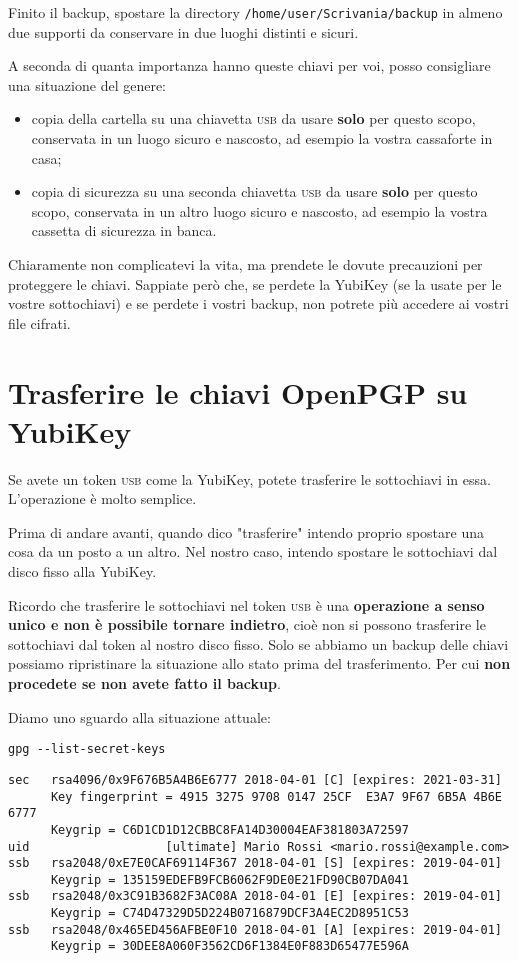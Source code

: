 \documentclass[a4paper,10pt]{article}
\begin{document}
Finito il backup, spostare la directory \texttt{/home/user/Scrivania/backup} in almeno due supporti da conservare in due luoghi distinti e sicuri.

A seconda di quanta importanza hanno queste chiavi per voi, posso consigliare una situazione del genere:

\begin{itemize}
 \item copia della cartella su una chiavetta \textsc{usb} da usare \textbf{solo} per questo scopo, conservata in un luogo sicuro e nascosto, ad esempio la vostra cassaforte in casa;
 \item copia di sicurezza su una seconda chiavetta \textsc{usb} da usare \textbf{solo} per questo scopo, conservata in un altro luogo sicuro e nascosto, ad esempio la vostra cassetta di sicurezza in banca.
\end{itemize}

Chiaramente non complicatevi la vita, ma prendete le dovute precauzioni per proteggere le chiavi. Sappiate però che, se perdete la YubiKey (se la usate per le vostre sottochiavi) e se perdete i vostri backup, non potrete più accedere ai vostri file cifrati.

\section{Trasferire le chiavi OpenPGP su YubiKey}

Se avete un token \textsc{usb} come la YubiKey, potete trasferire le sottochiavi in essa. L'operazione è molto semplice.

Prima di andare avanti, quando dico "trasferire" intendo proprio spostare una cosa da un posto a un altro. Nel nostro caso, intendo spostare le sottochiavi dal disco fisso alla YubiKey.

Ricordo che trasferire le sottochiavi nel token \textsc{usb} è una \textbf{operazione a senso unico e non è possibile tornare indietro}, cioè non si possono trasferire le sottochiavi dal token al nostro disco fisso. Solo se abbiamo un backup delle chiavi possiamo ripristinare la situazione allo stato prima del trasferimento. Per cui \textbf{non procedete se non avete fatto il backup}.

Diamo uno sguardo alla situazione attuale:

\begin{lstlisting}
gpg --list-secret-keys
\end{lstlisting}

\begin{lstlisting}
sec   rsa4096/0x9F676B5A4B6E6777 2018-04-01 [C] [expires: 2021-03-31]
      Key fingerprint = 4915 3275 9708 0147 25CF  E3A7 9F67 6B5A 4B6E 6777
      Keygrip = C6D1CD1D12CBBC8FA14D30004EAF381803A72597
uid                   [ultimate] Mario Rossi <mario.rossi@example.com>
ssb   rsa2048/0xE7E0CAF69114F367 2018-04-01 [S] [expires: 2019-04-01]
      Keygrip = 135159EDEFB9FCB6062F9DE0E21FD90CB07DA041
ssb   rsa2048/0x3C91B3682F3AC08A 2018-04-01 [E] [expires: 2019-04-01]
      Keygrip = C74D47329D5D224B0716879DCF3A4EC2D8951C53
ssb   rsa2048/0x465ED456AFBE0F10 2018-04-01 [A] [expires: 2019-04-01]
      Keygrip = 30DEE8A060F3562CD6F1384E0F883D65477E596A
\end{lstlisting}
\end{document}
